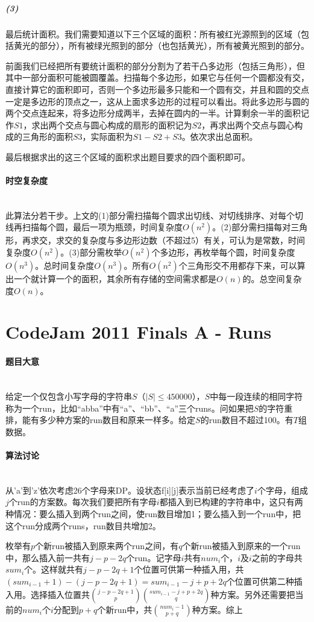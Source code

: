 \documentclass[UTF8]{ctexart}
\newcommand{\myparagraph}[1]{\paragraph{#1}\mbox{}\\}
\theoremstyle{nonumberplain}
\begin{document}
			\subparagraph{(3)}
			最后统计面积。我们需要知道以下三个区域的面积：所有被红光源照到的区域（包括黄光的部分），所有被绿光照到的部分（也包括黄光），所有被黄光照到的部分。
			
			前面我们已经把所有要统计面积的部分分割为了若干凸多边形（包括三角形），但其中一部分面积可能被圆覆盖。扫描每个多边形，如果它与任何一个圆都没有交，直接计算它的面积即可，否则一个多边形最多只能和一个圆有交，并且和圆的交点一定是多边形的顶点之一，这从上面求多边形的过程可以看出。将此多边形与圆的两个交点连起来，将多边形分成两半，去掉在圆内的一半。计算剩余一半的面积记作$S1$，求出两个交点与圆心构成的扇形的面积记为$S2$，再求出两个交点与圆心构成的三角形的面积$S3$，实际面积为$S1-S2+S3$。依次求出总面积。
			
			最后根据求出的这三个区域的面积求出题目要求的四个面积即可。
		
		\myparagraph{时空复杂度}
		
			此算法分若干步。上文的(1)部分需扫描每个圆求出切线、对切线排序、对每个切线再扫描每个圆，最后一项为瓶颈，时间复杂度$O(n^2)$。(2)部分需扫描每对三角形，再求交，求交的复杂度与多边形边数（不超过5）有关，可认为是常数，时间复杂度$O(n^2)$。(3)部分需枚举$O(n^2)$个多边形，再枚举每个圆，时间复杂度$O(n^3)$。总时间复杂度$O(n^3)$。所有$O(n^2)$个三角形交不用都存下来，可以算出一个就计算一个的面积，其余所有存储的空间需求都是$O(n)$的。总空间复杂度$O(n)$。
	
	\section{CodeJam 2011 Finals A - Runs}
	
		\myparagraph{题目大意}
		
			给定一个仅包含小写字母的字符串$S$（$|S| \leq 450000$），$S$中每一段连续的相同字符称为一个run，比如“abba”中有“a”、“bb”、“a”三个runs。问如果把$S$的字符重排，能有多少种方案的run数目和原来一样多。给定$S$的run数目不超过100。有$T$组数据。
		
		\myparagraph{算法讨论}
		
			从'a'到'z'依次考虑26个字母来DP。设状态f[i][j]表示当前已经考虑了$i$个字母，组成$j$个run的方案数。每次我们要把所有字母$i$都插入到已构建的字符串中，这只有两种情况：要么插入到两个run之间，使run数目增加1；要么插入到一个run中，把这个run分成两个runs，run数目共增加2。
			
			枚举有$p$个新run被插入到原来两个run之间，有$q$个新run被插入到原来的一个run中，那么插入前一共有$j-p-2q$个run。记字母$i$共有$num_i$个，$i$及$i$之前的字母共$sum_i$个。这样就共有$j-p-2q+1$个位置可供第一种插入用，共$(sum_{i-1}+1)-(j-p-2q+1)=sum_{i-1}-j+p+2q$个位置可供第二种插入用。选择插入位置共$\binom{j-p-2q+1}{p}\binom{sum_{i-1}-j+p+2q}{q}$种方案。另外还需要把当前的$num_i$个$i$分配到$p+q$个新run中，共$\binom{num_i-1}{p+q}$种方案。综上
			
\end{document}
